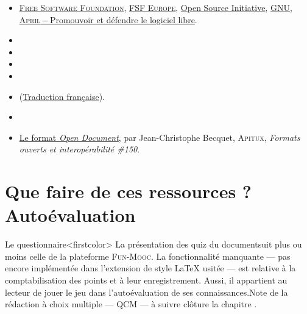 \begin{gofurther}[after skip=0pt, top=4pt, bottom=4pt]
\textsc{}
\smallskip
\begin{itemize}\jazzitem
	\item \href{https://www.fsf.org/}{\textsc{Free Software Foundation}}, \href{https://fsfe.org/index.fr.html}{\textsc{FSF Europe}}, \href{https://opensource.org/}{Open Source Initiative}, \href{https://www.gnu.org/home.fr.html}{GNU}, \href{https://www.april.org/}{\textsc{April}\,−\,Promouvoir et défendre le logiciel libre}.
	\item {}
	\item {}
	\item {}
	\item {}
	\item {} (\href{http://www.free-culture.cc/remixes/}{Traduction française}).
	\item {}
	\item \href{http://www.apitux.org/index.php?2006/04/04/150-bureautique-le-format-opendocument}{Le format \textit{Open Document}},  par Jean-Christophe Becquet, \textsc{Apitux}, \textit{Formats ouverts et interopérabilité \#150}.
\end{itemize}
\end{gofurther}


\vfill



\section[Que faire de ces ressources ? Quiz]{Que faire de ces ressources ? Autoévaluation}
\label{sec:I.5}


Le questionnaire\caution[t]<firstcolor>{%
La présentation des quiz du document\linebreak suit plus ou moins celle de la platefor\-me \textsc{Fun-Mooc}. La fonctionnalité manquante --- pas encore implémentée dans l'extension de style \LaTeX{} usitée --- est relative à la comptabilisation des points et à leur enregistrement. Aussi, il appartient au lecteur de jouer le jeu dans l'auto\-évaluation de ses connaissances.}{Note de la rédaction}
à choix multiple%
--- QCM --- à suivre clôture la chapitre .
\parnotes


